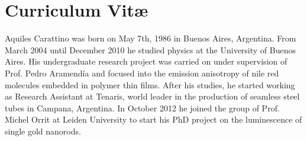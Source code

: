\chapter*{Curriculum Vit\ae}

Aquiles Carattino was born on May 7th, 1986 in Buenos Aires, Argentina. From
March 2004 until December 2010 he studied physics at the University of Buenos
Aires. His undergraduate research project was carried on under supervision of
Prof. Pedro Aramend\'{i}a and focused into the emission anisotropy of nile red
molecules embedded in polymer thin films. After his studies, he started working
as Research Assistant at Tenaris, world leader in the production of seamless
steel tubes in Campana, Argentina. In October 2012 he joined the group of Prof.
Michel Orrit at Leiden University to start his PhD project on the luminescence
of single gold nanorods.
